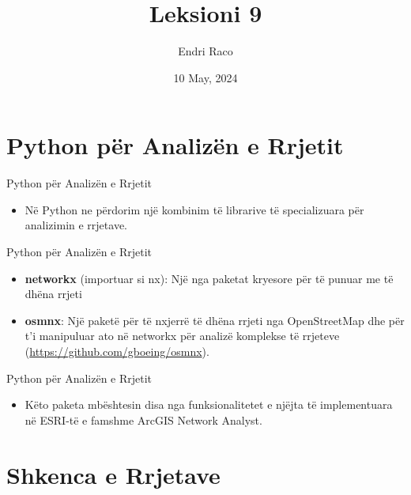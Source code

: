\documentclass[
  ignorenonframetext,
]{beamer}
\title{Leksioni 9}
\author{Endri Raco}
\date{10 May, 2024}
\providecommand{\tightlist}{%
  \setlength{\itemsep}{0pt}\setlength{\parskip}{0pt}}
\begin{document}
\frame{\titlepage}

\begin{frame}[allowframebreaks]
  \tableofcontents[hideallsubsections]
\end{frame}
\hypertarget{python-puxebr-analizuxebn-e-rrjetit}{%
\section{Python për Analizën e
Rrjetit}\label{python-puxebr-analizuxebn-e-rrjetit}}

\begin{frame}{Python për Analizën e Rrjetit}
\protect\hypertarget{python-puxebr-analizuxebn-e-rrjetit-1}{}
\begin{itemize}
\tightlist
\item
  Në Python ne përdorim një kombinim të librarive të specializuara për
  analizimin e rrjetave.
\end{itemize}
\end{frame}

\begin{frame}{Python për Analizën e Rrjetit}
\protect\hypertarget{python-puxebr-analizuxebn-e-rrjetit-2}{}
\begin{itemize}
\item
  \textbf{networkx} (importuar si nx): Një nga paketat kryesore për të
  punuar me të dhëna rrjeti
\item
  \textbf{osmnx}: Një paketë për të nxjerrë të dhëna rrjeti nga
  OpenStreetMap dhe për t'i manipuluar ato në networkx për analizë
  komplekse të rrjeteve (\url{https://github.com/gboeing/osmnx}).
\end{itemize}
\end{frame}

\begin{frame}{Python për Analizën e Rrjetit}
\protect\hypertarget{python-puxebr-analizuxebn-e-rrjetit-3}{}
\begin{itemize}
\tightlist
\item
  Këto paketa mbështesin disa nga funksionalitetet e njëjta të
  implementuara në ESRI-të e famshme ArcGIS Network Analyst.
\end{itemize}
\end{frame}

\hypertarget{shkenca-e-rrjetave}{%
\section{Shkenca e Rrjetave}\label{shkenca-e-rrjetave}}
\end{document}

